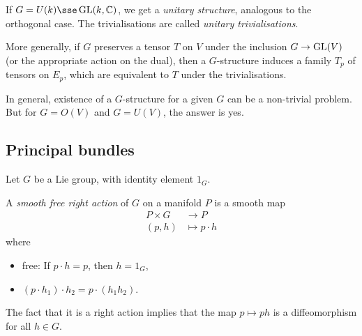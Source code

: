 \documentclass{article}
\begin{document}
\begin{example}
    If \(G = U(k) \sse \GL(k, \C)\), we get a \emph{unitary structure}, analogous to the orthogonal case. The trivialisations are called \emph{unitary trivialisations}.
\end{example}

More generally, if \(G\) preserves a tensor \(T\) on \(V\) under the inclusion \(G \to \operatorname{GL}(V)\) (or the appropriate action on the dual), then a \(G\)-structure induces a family \(T_p\) of tensors on \(E_p\), which are equivalent to \(T\) under the trivialisations.

In general, existence of a \(G\)-structure for a given \(G\) can be a non-trivial problem. But for \(G = O(V)\) and \(G = U(V)\), the answer is yes.

\subsection{Principal bundles}

Let \(G\) be a Lie group, with identity element \(1_G\).

\begin{definition}
     A \emph{smooth free right action} of \(G\) on a manifold \(P\) is a smooth map
    \begin{align*}
        P \times G &\to P \\
        (p, h) &\mapsto p\cdot h
    \end{align*}
    where
    \begin{itemize}[(i)]
        \item free: If \(p\cdot h = p\), then \(h = 1_G\),
        \item \((p\cdot h_1)\cdot h_2 = p\cdot (h_1h_2)\). 
    \end{itemize}
\end{definition}

\begin{remark}
    The fact that it is a right action implies that the map \(p \mapsto ph\) is a diffeomorphism for all \(h \in G\).
\end{remark}
\end{document}
